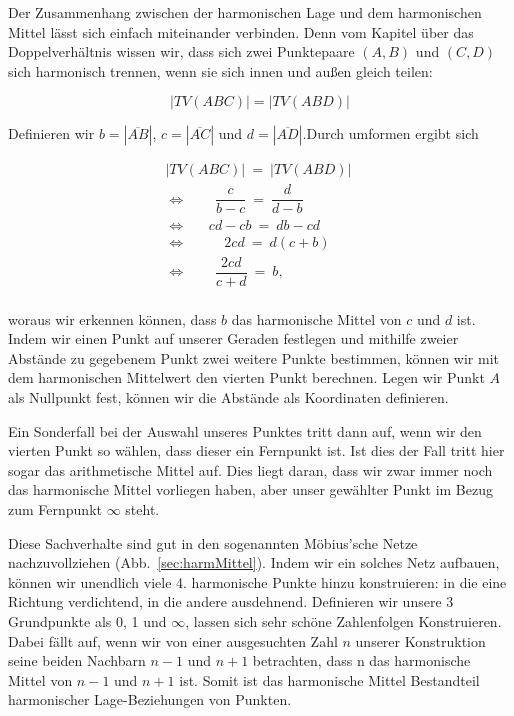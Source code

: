 \documentclass[12pt,a4paper]{article}
\begin{document}
Der Zusammenhang zwischen der harmonischen Lage und dem harmonischen Mittel lässt sich einfach miteinander verbinden. Denn vom Kapitel über das Doppelverhältnis wissen wir, dass sich zwei Punktepaare $(A, B)$ und $(C, D)$ sich harmonisch trennen, wenn sie sich innen und außen gleich teilen:

\[|TV(A B C)| = |TV(A B D)|\]

Definieren wir $b = |\overline{A B}|$, $c = |\overline{A C}|$ und $d = |\overline{A D}|$.Durch umformen ergibt sich

\begin{equation*}
\begin{split}
|TV(A B C)|~=~|TV(A B D)| ~\\
\Longleftrightarrow ~~~~~~~~~\dfrac{c}{b-c}~=~\dfrac{d}{d-b}~~~~~~~~~~\\
\Longleftrightarrow ~~~~~~~cd-cb~=~db-cd~~~~~~~~\\
\Longleftrightarrow ~~~~~~~~~~~~2 cd~=~d (c+b)~~~~~~~\\
\Longleftrightarrow ~~~~~~~~~\dfrac{2cd}{c+d}~=~b,~~~~~~~~~~~~~~~\\
\end{split}
\end{equation*}

woraus wir erkennen können, dass $b$ das harmonische Mittel von $c$ und $d$ ist. Indem wir einen Punkt auf unserer Geraden festlegen und mithilfe zweier Abstände zu gegebenem Punkt zwei weitere Punkte bestimmen, können wir mit dem harmonischen Mittelwert den vierten Punkt berechnen. Legen wir Punkt $A$ als Nullpunkt fest, können wir die Abstände als Koordinaten definieren.

Ein Sonderfall bei der Auswahl unseres Punktes tritt dann auf, wenn wir den vierten Punkt so wählen, dass dieser ein Fernpunkt ist. Ist dies der Fall tritt hier sogar das arithmetische Mittel auf. Dies liegt daran, dass wir zwar immer noch das harmonische Mittel vorliegen haben, aber unser gewählter Punkt im Bezug zum Fernpunkt $\infty$ steht.

Diese Sachverhalte sind gut in den sogenannten Möbius'sche Netze nachzuvollziehen (Abb.~\ref{sec:harmMittel}). Indem wir ein solches Netz aufbauen, können wir unendlich viele 4. harmonische Punkte hinzu konstruieren: in die eine Richtung verdichtend, in die andere ausdehnend. Definieren wir unsere 3 Grundpunkte als 0, 1 und $\infty$, lassen sich sehr schöne Zahlenfolgen Konstruieren. Dabei fällt auf, wenn wir von einer ausgesuchten Zahl $n$ unserer Konstruktion seine beiden Nachbarn $n-1$ und $n+1$ betrachten, dass n das harmonische Mittel von $n-1$ und $n+1$ ist. Somit ist das harmonische Mittel Bestandteil harmonischer Lage-Beziehungen von Punkten.
\end{document}

